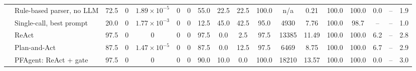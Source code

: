 {\begin{tabular}{ll ccccc cccc cc c cc cc}
\addlinespace
\multirow{5}{*}{Architectures (Sec.~\ref{sec:agents})} & Rule-based parser, no LLM & 72.5 & 0 & $1.89{\times}10^{-5}$ & 0 & 0 & 55.0 & 22.5 & 22.5 & 100.0 & n/a & 0.21 & 100.0 & 100.0 & 0.0 & -- & 1.9 \\
 & Single-call, best prompt & 20.0 & 0 & $1.77{\times}10^{-3}$ & 0 & 0 & 12.5 & 45.0 & 42.5 & 95.0 & 4930 & 7.76 & 100.0 & 98.7 & -- & -- & 1.0 \\
 & ReAct & 97.5 & 0 & 0 & 0 & 0 & 97.5 & 0.0 & 2.5 & 97.5 & 13385 & 11.49 & 100.0 & 100.0 & 6.2 & -- & 2.8 \\
 & Plan-and-Act & 87.5 & 0 & $1.47{\times}10^{-5}$ & 0 & 0 & 87.5 & 0.0 & 12.5 & 97.5 & 6469 & 8.75 & 100.0 & 100.0 & 6.7 & -- & 2.9 \\
 & PFAgent: ReAct + gate & 97.5 & 0 & 0 & 0 & 0 & 90.0 & 10.0 & 0.0 & 100.0 & 18210 & 13.57 & 100.0 & 100.0 & 0.0 & -- & 3.0 \\
\bottomrule
\end{tabular}}
